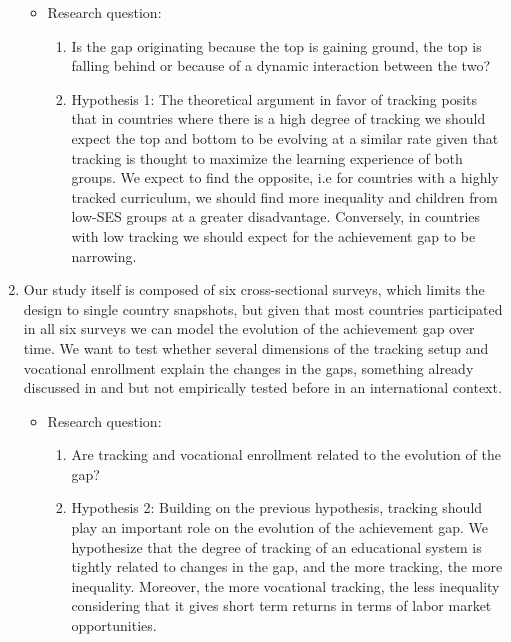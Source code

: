 \begin{enumerate}
\begin{itemize}
\item Research question:
\begin{enumerate}

\item Is the gap originating because the top is gaining ground, the top is falling behind or because of a dynamic interaction between the two?

\item Hypothesis 1: The theoretical argument in favor of tracking posits that in countries where there is a high degree of tracking we should expect the top and bottom to be evolving at a similar rate given that tracking is thought to maximize the learning experience of both groups. We expect to find the opposite, i.e for countries with a highly tracked curriculum, we should find more inequality and children from low-SES groups at a greater disadvantage. Conversely, in countries with low tracking we should expect for the achievement gap to be narrowing.

\end{enumerate}
\end{itemize}

\item Our study itself is composed of six cross-sectional surveys, which limits the design to single country snapshots, but given that most countries participated in all six surveys we can model the evolution of the achievement gap over time. We want to test whether several dimensions of the tracking setup and vocational enrollment explain the changes in the gaps, something already discussed in \citet{werfhorst_mijs} and \citet{hanushek_woesmann_tracking} but not empirically tested before in an international context.

\begin{itemize}
\item Research question:
\begin{enumerate}

\item Are tracking and vocational enrollment related to the evolution of the gap?

\item Hypothesis 2: Building on the previous hypothesis, tracking should play an important role on the evolution of the achievement gap. We hypothesize that the degree of tracking of an educational system is tightly related to changes in the gap, and the more tracking, the more inequality. Moreover, the more vocational tracking, the less inequality considering that it gives short term returns in terms of labor market opportunities.


\end{enumerate}
\end{itemize}
\end{enumerate}
